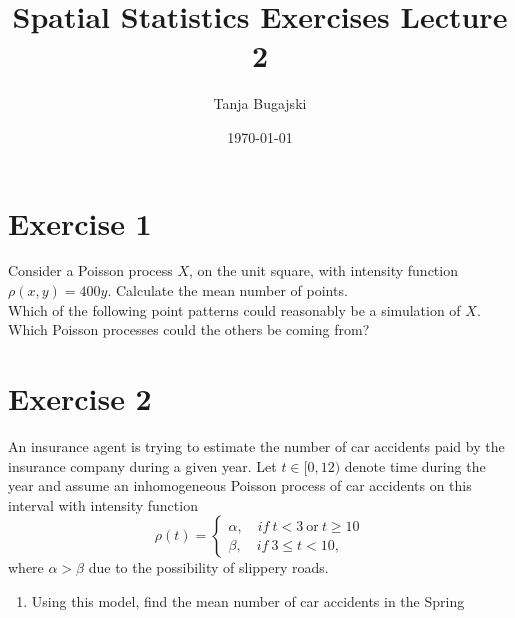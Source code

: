 \documentclass{article}
\title{Spatial Statistics Exercises Lecture 2}
\author{Tanja Bugajski}
\date{\today}
\begin{document}
\maketitle
\section{Exercise 1}
Consider a Poisson process $X$, on the unit square, with intensity function $\rho(x,y)=400y$. 
Calculate the mean number of points.\\
Which of the following point patterns could reasonably be a simulation of $X$. 
Which Poisson processes could the others be coming from?

\section{Exercise 2}
An insurance agent is trying to estimate the number of car accidents paid
by the insurance company during a given year. Let $t\in [0,12)$ denote
time during the year and assume an inhomogeneous Poisson process of
car accidents on this interval with intensity function
\[
\rho(t)=
\begin{cases}
    \alpha, \quad if\  t<3\  \text{or}\ t\geq 10\\
    \beta, \quad if\  3\leq t < 10,
\end{cases}
\]
where $\alpha > \beta$ due to the possibility of slippery roads.
\begin{enumerate}
    \item Using this model, find the mean number of car accidents in the Spring 

    

\end{enumerate}
\end{document}
